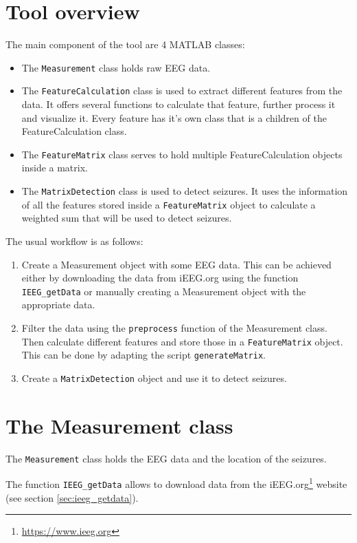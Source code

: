 \documentclass[usletter, 11pt]{extarticle}
\begin{document}
\section{Tool overview}

The main component of the tool are 4 MATLAB classes:
\begin{itemize}
	\item The \texttt{Measurement} class holds raw EEG data.
	\item The \texttt{FeatureCalculation} class is used to extract different features from the data. It offers several functions to calculate that feature, further process it and visualize it. Every feature has it's own class that is a children of the FeatureCalculation class.
	\item The \texttt{FeatureMatrix} class serves to hold multiple FeatureCalculation objects inside a matrix. 
	\item The \texttt{MatrixDetection} class is used to detect seizures. It uses the information of all the features stored inside a \verb|FeatureMatrix| object to calculate a weighted sum that will be used to detect seizures. \\
\end{itemize}

The usual workflow is as follows:
\begin{enumerate}
	\item Create a Measurement object with some EEG data. This can be achieved either by downloading the data from iEEG.org using the function \verb|IEEG_getData| or manually creating a Measurement object with the appropriate data.
	\item Filter the data using the \verb|preprocess| function of the Measurement class. Then calculate different features and store those in a \verb|FeatureMatrix| object. This can be done by adapting the script \verb|generateMatrix|.
	\item Create a \verb|MatrixDetection| object and use it to detect seizures.
\end{enumerate}

\newpage
\section{The Measurement class}


The \verb|Measurement| class holds the EEG data and the location of the seizures.

The function \verb|IEEG_getData| allows to download data from the iEEG.org\footnote{\url{https://www.ieeg.org}} website (see section \ref{sec:ieeg_getdata}). 
\end{document}
